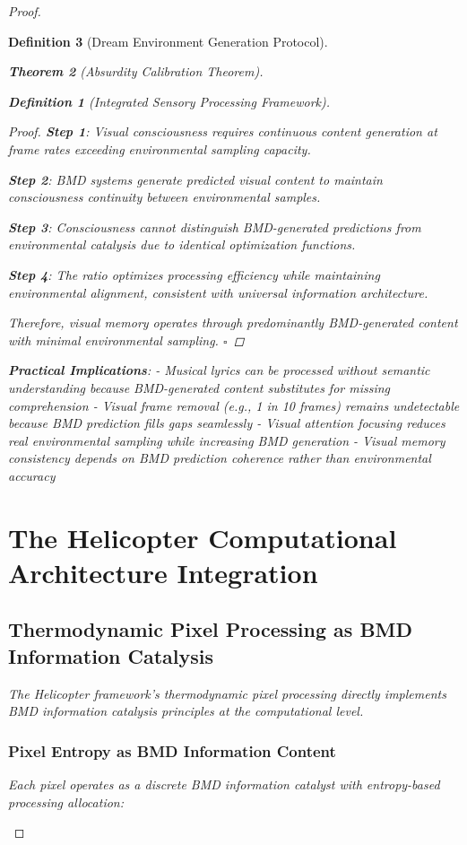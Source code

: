 \documentclass[12pt,a4paper]{article}
\newtheorem{theorem}{Theorem}[section]
\newtheorem{definition}[theorem]{Definition}
\begin{document}
\begin{proof}
\begin{definition}[Dream Environment Generation Protocol]
\begin{theorem}[Absurdity Calibration Theorem]
\begin{observation}
\begin{definition}[Integrated Sensory Processing Framework]
\begin{proof}
\textbf{Step 1}: Visual consciousness requires continuous content generation at frame rates exceeding environmental sampling capacity.

\textbf{Step 2}: BMD systems generate predicted visual content to maintain consciousness continuity between environmental samples.

\textbf{Step 3}: Consciousness cannot distinguish BMD-generated predictions from environmental catalysis due to identical optimization functions.

\textbf{Step 4}: The  ratio optimizes processing efficiency while maintaining environmental alignment, consistent with universal information architecture.

Therefore, visual memory operates through predominantly BMD-generated content with minimal environmental sampling. $\square$
\end{proof}

\textbf{Practical Implications}:
- Musical lyrics can be processed without semantic understanding because BMD-generated content substitutes for missing comprehension
- Visual frame removal (e.g., 1 in 10 frames) remains undetectable because BMD prediction fills gaps seamlessly
- Visual attention focusing reduces real environmental sampling while increasing BMD generation
- Visual memory consistency depends on BMD prediction coherence rather than environmental accuracy

\section{The Helicopter Computational Architecture Integration}

\subsection{Thermodynamic Pixel Processing as BMD Information Catalysis}

The Helicopter framework's thermodynamic pixel processing directly implements BMD information catalysis principles at the computational level.

\subsubsection{Pixel Entropy as BMD Information Content}

Each pixel operates as a discrete BMD information catalyst with entropy-based processing allocation:


\end{definition}
\end{observation}
\end{theorem}
\end{definition}
\end{proof}
\end{document}
